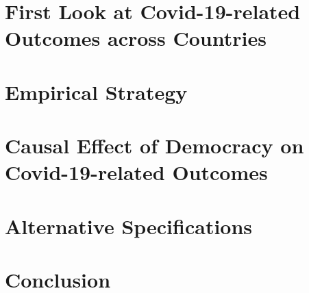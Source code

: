 \documentclass[8pt]{article}
\begin{document}
\section{First Look at Covid-19-related Outcomes across Countries} \label{sec:ols}


\section{Empirical Strategy} \label{sec:empirical-strategy}


\section{Causal Effect of Democracy on Covid-19-related Outcomes} \label{sec:causal}


\section{Alternative Specifications} \label{sec:robust}



% 

%

\section{Conclusion} \label{sec:conclusion}


\newpage
\printbibliography[title={References}]
% 



\newpage
\appendix
\renewcommand{\appendixtocname}{Appendix}
\setcounter{table}{0}
\renewcommand{\thetable}{A\arabic{table}}
\setcounter{figure}{0}
\renewcommand{\thefigure}{A\arabic{figure}}




\end{document}
